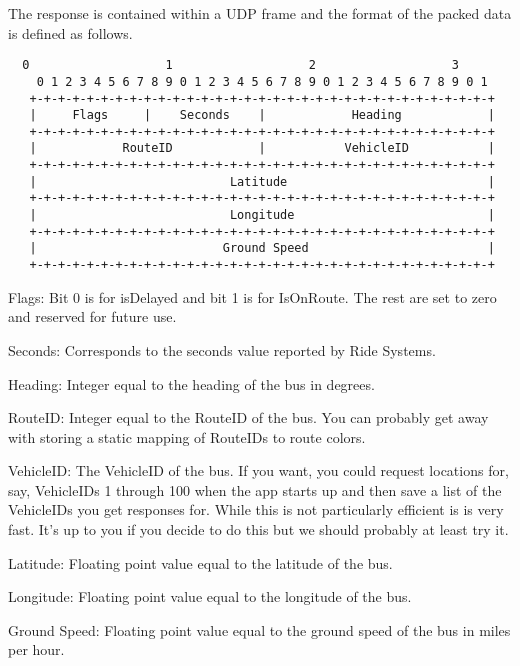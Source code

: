 \documentclass[11pt,letterpaper]{article}
\begin{document}
\noindent The response is contained within a UDP frame and the format of the packed data is defined as follows. 

\begin{verbatim}
  0                   1                   2                   3
    0 1 2 3 4 5 6 7 8 9 0 1 2 3 4 5 6 7 8 9 0 1 2 3 4 5 6 7 8 9 0 1
   +-+-+-+-+-+-+-+-+-+-+-+-+-+-+-+-+-+-+-+-+-+-+-+-+-+-+-+-+-+-+-+-+
   |     Flags     |    Seconds    |            Heading            |
   +-+-+-+-+-+-+-+-+-+-+-+-+-+-+-+-+-+-+-+-+-+-+-+-+-+-+-+-+-+-+-+-+
   |            RouteID            |           VehicleID           |
   +-+-+-+-+-+-+-+-+-+-+-+-+-+-+-+-+-+-+-+-+-+-+-+-+-+-+-+-+-+-+-+-+
   |                           Latitude                            |
   +-+-+-+-+-+-+-+-+-+-+-+-+-+-+-+-+-+-+-+-+-+-+-+-+-+-+-+-+-+-+-+-+
   |                           Longitude                           |
   +-+-+-+-+-+-+-+-+-+-+-+-+-+-+-+-+-+-+-+-+-+-+-+-+-+-+-+-+-+-+-+-+
   |                          Ground Speed                         |
   +-+-+-+-+-+-+-+-+-+-+-+-+-+-+-+-+-+-+-+-+-+-+-+-+-+-+-+-+-+-+-+-+
\end{verbatim}

\noindent Flags: Bit 0 is for isDelayed and bit 1 is for IsOnRoute. The rest are set to zero and reserved for future use. 

\noindent Seconds: Corresponds to the seconds value reported by Ride Systems. 

\noindent Heading: Integer equal to the heading of the bus in degrees. 

\noindent RouteID: Integer equal to the RouteID of the bus. You can probably get away with storing a static mapping of RouteIDs to route colors. 

\noindent VehicleID: The VehicleID of the bus. If you want, you could request locations for, say, VehicleIDs 1 through 100 when the app starts up and then save a list of the VehicleIDs you get responses for. While this is not particularly efficient is is very fast. It's up to you if you decide to do this but we should probably at least try it. 

\noindent Latitude: Floating point value equal to the latitude of the bus.

\noindent Longitude: Floating point value equal to the longitude of the bus.

\noindent Ground Speed: Floating point value equal to the ground speed of the bus in miles per hour. 
\end{document}
